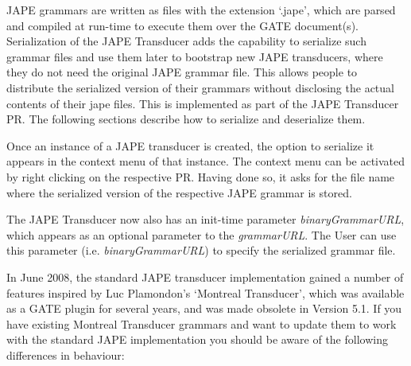 
JAPE grammars are written as files with the extension `.jape', which
are parsed and compiled at run-time to execute them over the GATE
document(s). Serialization of the JAPE Transducer adds the capability
to serialize such grammar files and use them later to bootstrap new
JAPE transducers, where they do not need the original JAPE grammar
file. This allows people to distribute the serialized version of their
grammars without disclosing the actual contents of their jape
files. This is implemented as part of the JAPE Transducer PR. The
following sections describe how to serialize and deserialize them.


Once an instance of a JAPE transducer is created, the option to
serialize it appears in the context menu of that instance. The context
menu can be activated by right clicking on the respective PR. Having
done so, it asks for the file name where the serialized version of the
respective JAPE grammar is stored.


The JAPE Transducer now also has an init-time
parameter \textit{binaryGrammarURL}, which appears as an optional
parameter to the \textit{grammarURL}. The User can use this parameter
(i.e. \textit{binaryGrammarURL}) to specify the serialized grammar
file.


In June 2008, the standard JAPE transducer implementation gained a number of
features inspired by Luc Plamondon's `Montreal Transducer', which was available
as a GATE plugin for several years, and was made obsolete in Version 5.1. If you
have existing Montreal Transducer grammars and want to update them to work with
the standard JAPE implementation you should be aware of the following differences
in behaviour:

